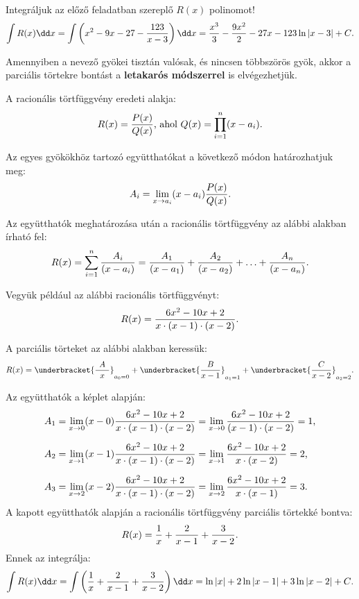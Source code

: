 \begin{example}
  Integráljuk az előző feladatban szereplő $R(x)$ polinomot!
  \[
    \int R(x) \dd x
    = \int \left( x^2 - 9x - 27 - \frac{123}{x - 3} \right) \dd x
    = \frac{x^3}{3} - \frac{9x^2}{2} - 27x - 123 \ln |x - 3| + C
    \text.
  \]
\end{example}

\begin{learnMore}
  Amennyiben a nevező gyökei tisztán valósak, és nincsen többszörös gyök, akkor
  a parciális törtekre bontást a \textbf{letakarós módszerrel} is elvégezhetjük.

  A racionális törtfüggvény eredeti alakja:
  \[
    R(x) = \frac{P(x)}{Q(x)}
    \text{, ahol }
    Q(x) = \prod_{i = 1}^n (x - a_i)
    \text.
  \]

  Az egyes gyökökhöz tartozó együtthatókat a következő módon határozhatjuk meg:
  \[
    A_i = \lim_{x \to a_i} (x - a_i) \frac{P(x)}{Q(x)}
    \text.
  \]

  Az együtthatók meghatározása után a racionális törtfüggvény az alábbi alakban
  írható fel:
  \[
    R(x)
    = \sum_{i = 1}^n \frac{A_i}{(x - a_i)}
    = \frac{A_1}{(x - a_1)} + \frac{A_2}{(x - a_2)} + \ldots + \frac{A_n}{(x - a_n)}
    \text.
  \]

  Vegyük például az alábbi racionális törtfüggvényt:
  \[
    R(x) = \frac{6 x^2 - 10 x + 2}{x \cdot (x - 1) \cdot (x - 2)}
    \text.
  \]

  A parciális törteket az alábbi alakban keressük:
  \[
    R(x)
    = \underbracket{\frac{A}{\phantom{a}x\phantom{a}}}_{a_0 = 0}
    + \underbracket{\frac{B}{x - 1}}_{a_1 = 1}
    + \underbracket{\frac{C}{x - 2}}_{a_2 = 2}
    \text.
  \]

  Az együtthatók a képlet alapján:
  \begin{align*}
    A_1
     & = \lim_{x \rightarrow 0}
    (x - 0) \frac{6 x^2 - 10 x + 2}{x \cdot (x - 1) \cdot (x - 2)}
    = \lim_{x \rightarrow 0}
    \frac{6 x^2 - 10 x + 2}{(x - 1) \cdot (x - 2)}
    = 1
    \text,                      \\[2mm]
    A_2
     & = \lim_{x \rightarrow 1}
    (x - 1) \frac{6 x^2 - 10 x + 2}{x \cdot (x - 1) \cdot (x - 2)}
    = \lim_{x \rightarrow 1}
    \frac{6 x^2 - 10 x + 2}{x \cdot (x - 2)}
    = 2
    \text,                      \\[2mm]
    A_3
     & = \lim_{x \rightarrow 2}
    (x - 2) \frac{6 x^2 - 10 x + 2}{x \cdot (x - 1) \cdot (x - 2)}
    = \lim_{x \rightarrow 2}
    \frac{6 x^2 - 10 x + 2}{x \cdot (x - 1)}
    = 3
    \text.
  \end{align*}
  A kapott együtthatók alapján a racionális törtfüggvény parciális törtekké
  bontva:
  \[
    R(x)
    = \frac{1}{x} + \frac{2}{x - 1} + \frac{3}{x - 2}
    \text.
  \]
  Ennek az integrálja:
  \[
    \int R(x) \dd x
    = \int \left( \frac{1}{x} + \frac{2}{x - 1} + \frac{3}{x - 2} \right) \dd x
    = \ln |x| + 2 \ln |x - 1| + 3 \ln |x - 2| + C
    \text.
  \]
\end{learnMore}

